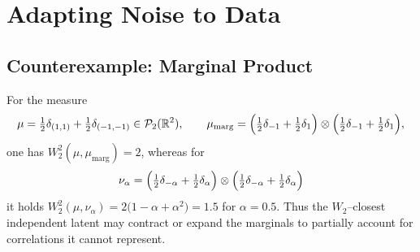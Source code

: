 \documentclass{article}
\newcommand{\R}{\mathbb{R}}
\theoremstyle{plain}
\theoremstyle{definition}
\theoremstyle{remark}
\begin{document}
{
\section{Adapting Noise to Data}\label{app:Learn Noise}
}

\subsection{Counterexample: Marginal Product}\label{example:Not Marginals}
For the measure
\[
\mu=\tfrac{1}{2}\delta_{(1,1)}+\tfrac{1}{2}\delta_{(-1,-1)}\in\mathcal P_2(\R^2),\qquad
\mu_{\mathrm{marg}}=\Bigl(\tfrac{1}{2}\delta_{-1}+\tfrac{1}{2}\delta_{1}\Bigr)\otimes\Bigl(\tfrac{1}{2}\delta_{-1}+\tfrac{1}{2}\delta_{1}\Bigr),
\]
one has $W_2^2(\mu,\mu_{\mathrm{marg}})=2$, whereas for
\[
\nu_\alpha=\Bigl(\tfrac{1}{2}\delta_{-\alpha}+\tfrac{1}{2}\delta_{\alpha}\Bigr)\otimes\Bigl(\tfrac{1}{2}\delta_{-\alpha}+\tfrac{1}{2}\delta_{\alpha}\Bigr)
\]
it holds $W_2^2(\mu,\nu_\alpha)=2\bigl(1-\alpha+\alpha^2\bigr) = 1.5$ for $\alpha=0.5$. {Thus the $W_2$–closest independent latent may contract or expand the marginals to partially account for correlations it cannot represent.}
\end{document}
